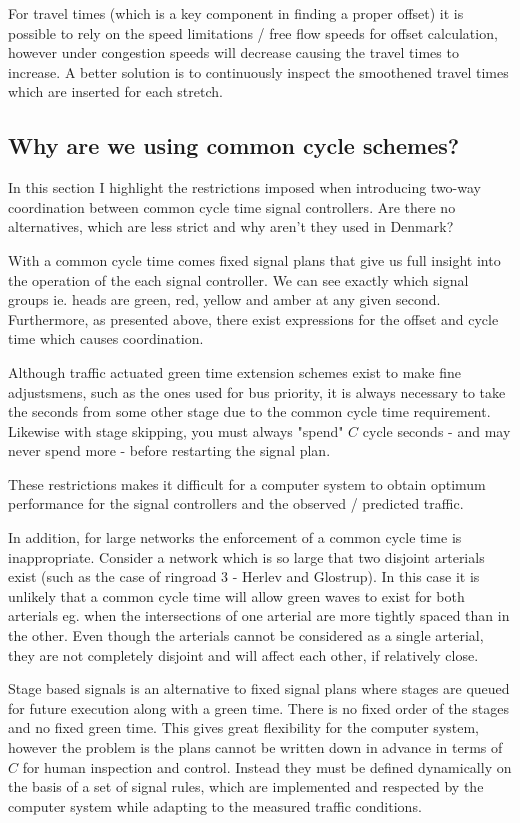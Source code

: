 For travel times (which is a key component in finding a proper offset) it is possible to rely on the speed limitations / free flow speeds for offset calculation, however under congestion speeds will decrease causing the travel times to increase. A better solution is to continuously inspect the smoothened travel times which are inserted for each stretch. 

\subsection*{Why are we using common cycle schemes?}
\label{phase_based}
In this section I highlight the restrictions imposed when introducing two-way coordination between common cycle time signal controllers. Are there no alternatives, which are less strict and why aren't they used in Denmark?

With a common cycle time comes fixed signal plans that give us full insight into the operation of the each signal controller. We can see exactly which signal groups ie. heads are green, red, yellow and amber at any given second. Furthermore, as presented above, there exist expressions for the offset and cycle time which causes coordination. 

Although traffic actuated green time extension schemes exist to make fine adjustsmens, such as the ones used for bus priority, it is always necessary to take the seconds from some other stage due to the common cycle time requirement. Likewise with stage skipping, you must always "spend" $C$ cycle seconds - and may never spend more - before restarting the signal plan.

These restrictions makes it difficult for a computer system to obtain optimum performance for the signal controllers and the observed / predicted traffic.

In addition, for large networks the enforcement of a common cycle time is inappropriate. Consider a network which is so large that two disjoint arterials exist (such as the case of ringroad 3 - Herlev and Glostrup). In this case it is unlikely that a common cycle time will allow green waves to exist for both arterials eg. when the intersections of one arterial are more tightly spaced than in the other. Even though the arterials cannot be considered as a single arterial, they are not completely disjoint and will affect each other, if relatively close.

Stage based signals is an alternative to fixed signal plans where stages are queued for future execution along with a green time. There is no fixed order of the stages and no fixed green time. This gives great flexibility for the computer system, however the problem is the plans cannot be written down in advance in terms of $C$ for human inspection and control. Instead they must be defined dynamically on the basis of a set of signal rules, which are implemented and respected by the computer system while adapting to the measured traffic conditions. 

